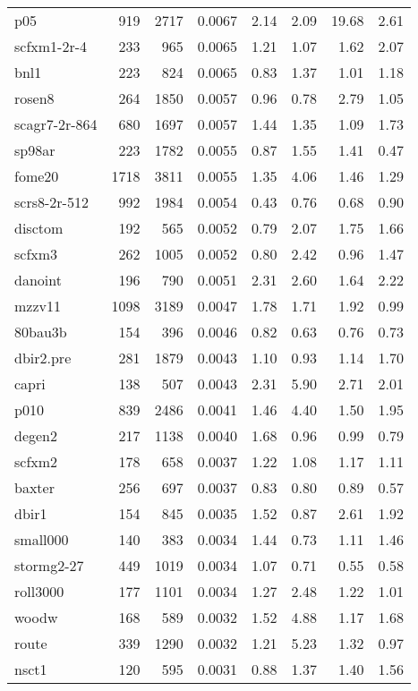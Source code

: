 \documentclass[10pt]{article}
\begin{document}
\begin{longtable}{|l|r|r|r|r|r|r|r|}
p05	&	919	&	2717	&	0.0067	&	2.14	&	2.09	&	19.68	&	2.61	\\
scfxm1-2r-4	&	233	&	965	&	0.0065	&	1.21	&	1.07	&	1.62	&	2.07	\\
bnl1	&	223	&	824	&	0.0065	&	0.83	&	1.37	&	1.01	&	1.18	\\
rosen8	&	264	&	1850	&	0.0057	&	0.96	&	0.78	&	2.79	&	1.05	\\
scagr7-2r-864	&	680	&	1697	&	0.0057	&	1.44	&	1.35	&	1.09	&	1.73	\\
sp98ar	&	223	&	1782	&	0.0055	&	0.87	&	1.55	&	1.41	&	0.47	\\
fome20	&	1718	&	3811	&	0.0055	&	1.35	&	4.06	&	1.46	&	1.29	\\
scrs8-2r-512	&	992	&	1984	&	0.0054	&	0.43	&	0.76	&	0.68	&	0.90	\\
disctom	&	192	&	565	&	0.0052	&	0.79	&	2.07	&	1.75	&	1.66	\\
scfxm3	&	262	&	1005	&	0.0052	&	0.80	&	2.42	&	0.96	&	1.47	\\
danoint	&	196	&	790	&	0.0051	&	2.31	&	2.60	&	1.64	&	2.22	\\
mzzv11	&	1098	&	3189	&	0.0047	&	1.78	&	1.71	&	1.92	&	0.99	\\
80bau3b	&	154	&	396	&	0.0046	&	0.82	&	0.63	&	0.76	&	0.73	\\
dbir2.pre	&	281	&	1879	&	0.0043	&	1.10	&	0.93	&	1.14	&	1.70	\\
capri	&	138	&	507	&	0.0043	&	2.31	&	5.90	&	2.71	&	2.01	\\
p010	&	839	&	2486	&	0.0041	&	1.46	&	4.40	&	1.50	&	1.95	\\
degen2	&	217	&	1138	&	0.0040	&	1.68	&	0.96	&	0.99	&	0.79	\\
scfxm2	&	178	&	658	&	0.0037	&	1.22	&	1.08	&	1.17	&	1.11	\\
baxter	&	256	&	697	&	0.0037	&	0.83	&	0.80	&	0.89	&	0.57	\\
dbir1	&	154	&	845	&	0.0035	&	1.52	&	0.87	&	2.61	&	1.92	\\
small000	&	140	&	383	&	0.0034	&	1.44	&	0.73	&	1.11	&	1.46	\\
stormg2-27	&	449	&	1019	&	0.0034	&	1.07	&	0.71	&	0.55	&	0.58	\\
roll3000	&	177	&	1101	&	0.0034	&	1.27	&	2.48	&	1.22	&	1.01	\\
woodw	&	168	&	589	&	0.0032	&	1.52	&	4.88	&	1.17	&	1.68	\\
route	&	339	&	1290	&	0.0032	&	1.21	&	5.23	&	1.32	&	0.97	\\
nsct1	&	120	&	595	&	0.0031	&	0.88	&	1.37	&	1.40	&	1.56	\\

\end{longtable}
\end{document}
